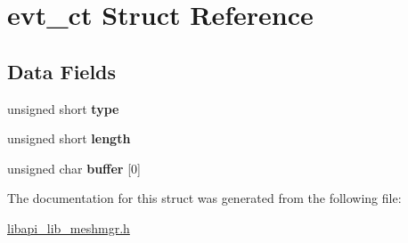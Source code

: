 \hypertarget{structevt__ct}{}\section{evt\+\_\+ct Struct Reference}
\label{structevt__ct}
\subsection*{Data Fields}
\begin{DoxyCompactItemize}
\item 
\mbox{\label{structevt__ct_aab8b1e9fa94590b1d1ad3d6ced4747e9}} 
unsigned short {\bfseries type}
\item 
\mbox{\label{structevt__ct_a9451fc3b8a5788ad2f6dae6daca94219}} 
unsigned short {\bfseries length}
\item 
\mbox{\label{structevt__ct_ab01ea550405af2a2e487543b788fe8f1}} 
unsigned char {\bfseries buffer} \mbox{[}0\mbox{]}
\end{DoxyCompactItemize}


The documentation for this struct was generated from the following file\+:\begin{DoxyCompactItemize}
\item 
\hyperlink{libapi__lib__meshmgr_8h}{libapi\+\_\+lib\+\_\+meshmgr.\+h}\end{DoxyCompactItemize}

